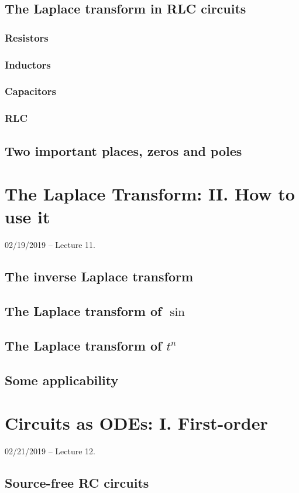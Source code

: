 \documentclass[11pt]{book}
\begin{document}
\section{The Laplace transform in RLC circuits}
\subsection{Resistors}
\subsection{Inductors}
\subsection{Capacitors}
\subsection{RLC}
\section{Two important places, zeros and poles}



\chapter{The Laplace Transform: II. How to use it}
02/19/2019 – Lecture 11. 
\section{The inverse Laplace transform}
\section{The Laplace transform of $\sin$}
\section{The Laplace transform of $t^n$}
\section{Some applicability}



\chapter{Circuits as ODEs: I. First-order}
02/21/2019 – Lecture 12. 
\section{Source-free RC circuits}
\end{document}
